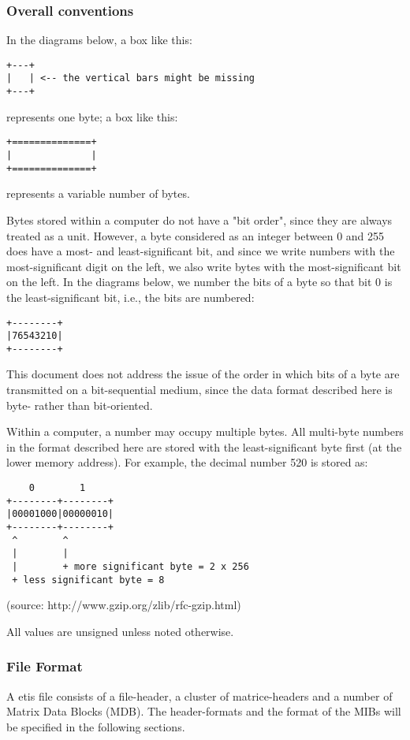 \subsubsection{Overall conventions}
In the diagrams below, a box like this:
\begin{verbatim}
+---+
|   | <-- the vertical bars might be missing
+---+
\end{verbatim}
represents one byte; a box like this:
\begin{verbatim}
+==============+
|              |
+==============+
\end{verbatim}
represents a variable number of bytes.

Bytes stored within a computer do not have a "bit order", since they are always treated as a unit. However, 
a byte considered as an integer between 0 and 255 does have a most- and least-significant bit, and since we 
write numbers with the most-significant digit on the left, we also write bytes with the most-significant bit 
on the left. In the diagrams below, we number the bits of a byte so that bit 0 is the least-significant bit, 
i.e., the bits are numbered:
\begin{verbatim}
+--------+
|76543210|
+--------+
\end{verbatim}
This document does not address the issue of the order in which bits of a byte are transmitted on a bit-sequential 
medium, since the data format described here is byte- rather than bit-oriented.

Within a computer, a number may occupy multiple bytes. All multi-byte numbers in the format described here are 
stored with the least-significant byte first (at the lower memory address). For example, the decimal number 520 
is stored as:
\begin{verbatim}
    0        1
+--------+--------+
|00001000|00000010|
+--------+--------+
 ^        ^
 |        |
 |        + more significant byte = 2 x 256
 + less significant byte = 8
\end{verbatim}
(source: http://www.gzip.org/zlib/rfc-gzip.html)

All values are unsigned unless noted otherwise.

\subsubsection{File Format}

A etis file consists of a file-header, a cluster of matrice-headers and a number of Matrix Data Blocks (MDB). 
The header-formats and the format of the MIBs will be specified in the following sections.

